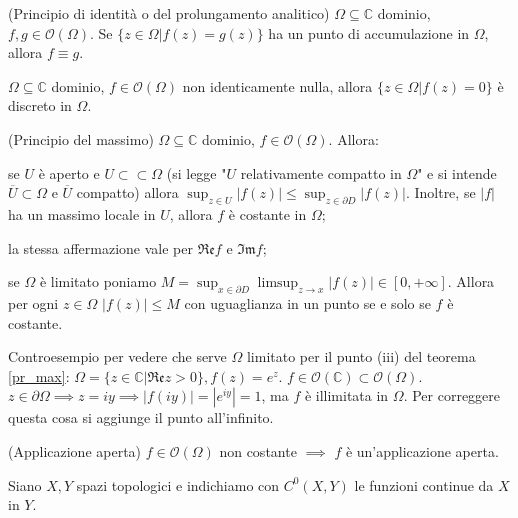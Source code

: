 \begin{thm}
  (Principio di identità o del prolungamento analitico) $\Omega \subseteq \mathbb{C}$ dominio, $f, g \in \mathcal{O}(\Omega)$. Se $\{z \in \Omega | f(z)=g(z)\}$ ha un punto di accumulazione in $\Omega$, allora $f \equiv g$.
\end{thm}

\begin{cor}
  $\Omega \subseteq \mathbb{C}$ dominio, $f \in \mathcal{O}(\Omega)$ non identicamente nulla, allora $\{z \in \Omega | f(z)=0\}$ è discreto in $\Omega$.
\end{cor}

\begin{thm} \label{pr_max}
  (Principio del massimo) $\Omega \subseteq \mathbb{C}$ dominio, $f \in \mathcal{O}(\Omega)$. Allora:
  \begin{nlist}
    \item se $U$ è aperto e $U \subset \subset \Omega$ (si legge "$U$ relativamente compatto in $\Omega$" e si intende $\overline{U} \subset \Omega$ e $\overline{U}$ compatto) allora $\displaystyle \sup_{z \in U} |f(z)| \le \sup_{z \in \partial D} |f(z)|$. Inoltre, se $|f|$ ha un massimo locale in $U$, allora $f$ è costante in $\Omega$;
    \item la stessa affermazione vale per $\mathfrak{Re} f$ e $\mathfrak{Im} f$;
    \item se $\Omega$ è limitato poniamo $\displaystyle M=\sup_{x \in \partial D} \limsup_{z \rightarrow x} |f(z)| \in [0, +\infty]$. Allora per ogni $z \in \Omega$ $|f(z)| \le M$ con uguaglianza in un punto se e solo se $f$ è costante.
  \end{nlist}
\end{thm}

\begin{ex}
  Controesempio per vedere che serve $\Omega$ limitato per il punto (iii) del teorema \ref{pr_max}: $\Omega=\{z \in \mathbb{C} | \mathfrak{Re} z>0\}, f(z)=e^z$. $f \in \mathcal{O}(\mathbb{C}) \subset \mathcal{O}(\Omega)$.
  $z \in \partial\Omega \implies z=iy \implies |f(iy)|=|e^{iy}|=1$, ma $f$ è illimitata in $\Omega$. Per correggere questa cosa si aggiunge il punto all'infinito.
\end{ex}

\begin{thm}
  (Applicazione aperta) $f \in \mathcal{O}(\Omega)$ non costante $\implies$ $f$ è un'applicazione aperta.
\end{thm}

Siano $X, Y$ spazi topologici e indichiamo con $C^0(X, Y)$ le funzioni continue da $X$ in $Y$.


